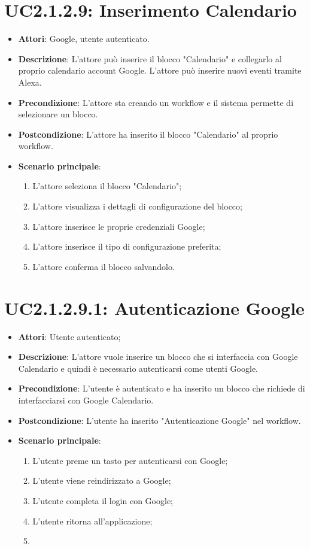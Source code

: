 \section{UC2.1.2.9: Inserimento Calendario}
\label{UC2.1.2.9}
\begin{itemize}
	\item \textbf{Attori}: Google, utente autenticato.
	\item \textbf{Descrizione}: L'attore può inserire il blocco "Calendario" e collegarlo al proprio calendario account Google. L'attore può inserire nuovi eventi tramite Alexa.
	\item \textbf{Precondizione}: L'attore sta creando un workflow e il sistema permette di selezionare un blocco.
	\item \textbf{Postcondizione}: L'attore ha inserito il blocco "Calendario" al proprio workflow.
	\item \textbf{Scenario principale}:
	\begin{enumerate} \item L'attore seleziona il blocco "Calendario"; \item L'attore visualizza i dettagli di configurazione del blocco; \item  L'attore inserisce le proprie credenziali Google; \item L'attore inserisce il tipo di configurazione preferita; \item L'attore conferma il blocco salvandolo.\end{enumerate}
\end{itemize}

\section{UC2.1.2.9.1: Autenticazione Google}
\label{UC2.1.2.9.1}
\begin{itemize}
	\item \textbf{Attori}: Utente autenticato;
	\item \textbf{Descrizione}: L'attore vuole inserire un blocco che si interfaccia con Google Calendario e quindi è necessario autenticarsi come utenti Google.
	\item \textbf{Precondizione}: L'utente è autenticato e ha inserito un blocco che richiede di interfacciarsi con Google Calendario.
	\item \textbf{Postcondizione}: L'utente ha inserito "Autenticazione Google" nel workflow.
	\item \textbf{Scenario principale}:
	\begin{enumerate} \item L'utente preme un tasto per autenticarsi con Google;  \item  L'utente viene reindirizzato a Google;  \item  L'utente completa il login con Google;  \item  L'utente ritorna all'applicazione;  \item \end{enumerate}
\end{itemize}

